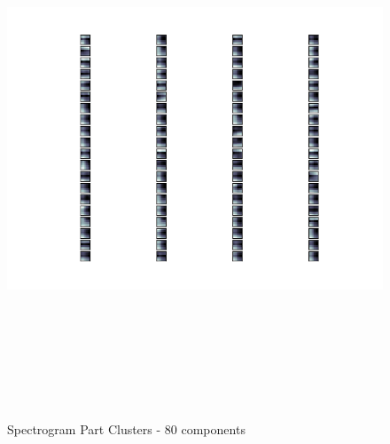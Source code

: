 \documentclass[11pt]{article}
\begin{document}
\begin{figure}[htb]
\centering
\includegraphics[height=16cm]{./spec_avg_parts_80.png}
\caption{\label{fig:spec_avg_parts_80}Spectrogram Part Clusters - 80 components}
\end{figure}
\end{document}
